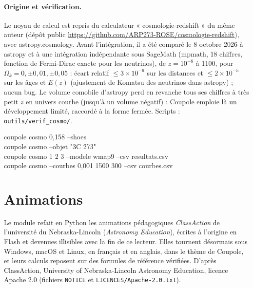 \paragraph{Origine et vérification.} Le noyau de calcul est repris du calculateur « cosmologie-redshift » du même
auteur (dépôt public \url{https://github.com/ARP273-ROSE/cosmologie-redshift}), avec astropy.cosmology. Avant
l'intégration, il a été comparé le 8 octobre 2026 à astropy et à une intégration indépendante sous SageMath
(mpmath, 18 chiffres, fonction de Fermi-Dirac exacte pour les neutrinos), de $z = 10^{-8}$ à 1100, pour
$\Omega_k = 0, \pm0{,}01, \pm0{,}05$ : écart relatif $\le 3\times10^{-6}$ sur les distances et
$\le 2\times10^{-5}$ sur les âges et $E(z)$ (ajustement de Komatsu des neutrinos dans astropy) ; aucun bug. Le
volume comobile d'astropy perd en revanche tous ses chiffres à très petit $z$ en univers courbe (jusqu'à un volume
négatif) : Coupole emploie là un développement limité, raccordé à la forme fermée. Scripts :
\texttt{outils/verif\_cosmo/}.

\begin{ccode}
coupole cosmo 0,158 --shoes\\
coupole cosmo --objet "3C 273"\\
coupole cosmo 1 2 3 --modele wmap9 --csv resultats.csv\\
coupole cosmo --courbes 0,001 1500 300 --csv courbes.csv
\end{ccode}

\section{Animations}\label{sec:anim}
Le module refait en Python les animations pédagogiques \emph{ClassAction} de l'université du Nebraska-Lincoln
(\emph{Astronomy Education}), écrites à l'origine en Flash et devenues illisibles avec la fin de ce lecteur. Elles
tournent désormais sous Windows, macOS et Linux, en français et en anglais, dans le thème de Coupole, et leurs calculs
reposent sur des formules de référence vérifiées. D'après ClassAction, University of Nebraska-Lincoln Astronomy
Education, licence Apache 2.0 (fichiers \texttt{NOTICE} et \texttt{LICENCES/Apache-2.0.txt}).


